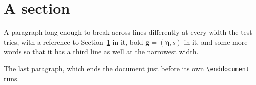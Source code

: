 \documentclass{oldend}
\begin{document}
\section{A section}\label{sec}
A paragraph long enough to break across lines differently at every width
the test tries, with a reference to Section~\ref{sec} in it, bold
$\bm{g} = (\bm{\eta}, s)$ in it, and some more words so that it has a
third line as well at the narrowest width.

The last paragraph, which ends the document just before its own
\verb|\enddocument| runs.
\end{document}
